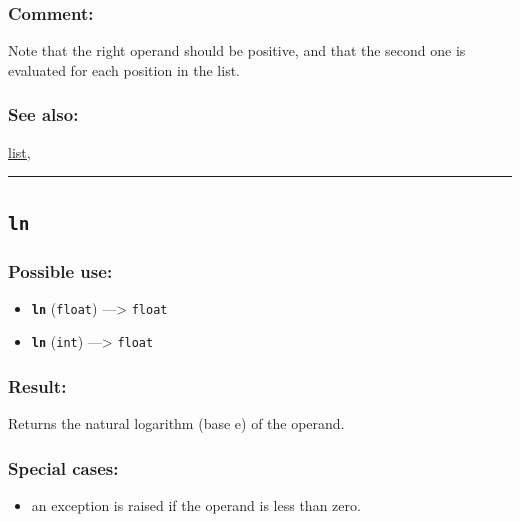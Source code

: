 \documentclass[]{book}
\providecommand{\tightlist}{%
  \setlength{\itemsep}{0pt}\setlength{\parskip}{0pt}}
\theoremstyle{definition}
\theoremstyle{definition}
\theoremstyle{definition}
\theoremstyle{remark}
\begin{document}
\subsubsection{Comment:}\label{comment-61}

Note that the right operand should be positive, and that the second one
is evaluated for each position in the list.

\subsubsection{See also:}\label{see-also-127}

\href{operators-i-to-m.html\#list}{list},

\begin{center}\rule{0.5\linewidth}{\linethickness}\end{center}

\subsection{\texorpdfstring{\texttt{ln}}{ln}}\label{ln}

\subsubsection{Possible use:}\label{possible-use-325}

\begin{itemize}
\tightlist
\item
  \textbf{\texttt{ln}} (\texttt{float}) ---\textgreater{} \texttt{float}
\item
  \textbf{\texttt{ln}} (\texttt{int}) ---\textgreater{} \texttt{float}
\end{itemize}

\subsubsection{Result:}\label{result-315}

Returns the natural logarithm (base e) of the operand.

\subsubsection{Special cases:}\label{special-cases-90}

\begin{itemize}
\tightlist
\item
  an exception is raised if the operand is less than zero.
\end{itemize}
\end{document}
